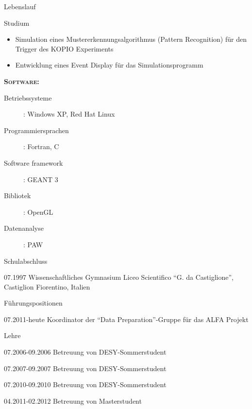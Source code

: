\documentclass[11pt,a4paper]{scrartcl}
\begin{document}
\begin{cv}{Lebenslauf}
\begin{cvlist}{Studium}
    \begin{itemize}	
    \item Simulation eines Mustererkennungsalgorithmus (Pattern
      Recognition) f{\"u}r den Trigger des KOPIO Experiments
    \item Entwicklung eines Event Display f{\"u}r das Simulationsprogramm
    \end{itemize}
    
    {\scshape {\bfseries Software:}}
    \begin{description} 
    \item[Betriebssysteme] : Windows XP, Red Hat Linux 
    \item[Programmiersprachen] : Fortran, C 
    \item[Software framework] : GEANT 3
    \item[Bibliotek] : OpenGL
    \item[Datenanalyse] : PAW
    \end{description}
  \end{cvlist}

  \begin{cvlist}{Schulabschluss}
  \item[07.1997] Wissenschaftliches Gymnasium Liceo Scientifico "`G. da
    Castiglione"', Castiglion Fiorentino, Italien
  \end{cvlist}
  
  \begin{cvlist}{F\"uhrungspositionen}
  \item [07.2011-heute] Koordinator der "`Data Preparation"'-Gruppe
    f\"ur das ALFA Projekt
  \end{cvlist}

  \begin{cvlist}{Lehre}
  \item [07.2006-09.2006] Betreuung von DESY-Sommerstudent
  \item [07.2007-09.2007] Betreuung von DESY-Sommerstudent
  \item [07.2010-09.2010] Betreuung von DESY-Sommerstudent
  \item [04.2011-02.2012] Betreuung von Masterstudent
  \end{cvlist}
  

\end{cv}
\end{document}
